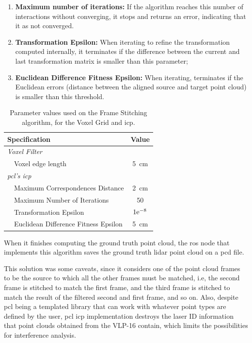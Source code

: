 \begin{enumerate}
	\item \textbf{Maximum number of iterations:} If the algorithm reaches this number of interactions without converging, it stops and returns an error, indicating that it as not converged.
	\item \textbf{Transformation Epsilon:} When iterating to refine the transformation computed internally, it terminates if the difference between the current and last transformation matrix is smaller than this parameter;
	\item \textbf{Euclidean Difference Fitness Epsilon:} When iterating, terminates if the Euclidean errors (distance between the aligned source and target point cloud) is smaller than this threshold.
\end{enumerate}


\begin{table}[H]
	\centering
	\renewcommand{\arraystretch}{1.2}
	\begin{tabular}{@{}lp{8cm}c@{}}
		\toprule
		\multicolumn{2}{l}{Specification} & Value \\
			\midrule
		\multicolumn{2}{l}{\textit{Voxel Filter}} & \\ 
		\phantom{ab} & Voxel edge length & \SI{5}{\centi\meter} \\ 
		\midrule
		\multicolumn{2}{l}{\textit{\ac{pcl}'s \ac{icp}}} &  \\ 
		\phantom{ab} & Maximum Correspondences Distance & \SI{2}{\centi\meter} \\
								 & Maximum Number of Iterations & 50 \\
								 & Transformation Epsilon & $1\mathrm{e}^{-8}$ \\
								 & Euclidean Difference Fitness Epsilon & \SI{5}{\centi\meter} \\
		\bottomrule
	\end{tabular}
	\caption{Parameter values used on the Frame Stitching algorithm, for the Voxel Grid and \ac{icp}.}
	\label{tab:frame-stitching-parameters}
\end{table}

When it finishes computing the ground truth point cloud, the \ac{ros} node that implements this algorithm saves the ground truth \ac{lidar} point cloud on a \ac{pcd} file.

This solution was some caveats, since it considers one of the point cloud frames to be the source to which all the other frames must be matched, i.e, the second frame is stitched to match the first frame, and the third frame is stitched to match the result of the filtered second and first frame, and so on. Also, despite \ac{pcl} being a templated library that can work with whatever point types are defined by the user, \ac{pcl} \ac{icp} implementation destroys the laser ID information that point clouds obtained from the VLP-16 contain, which limits the possibilities for interference analysis. 


